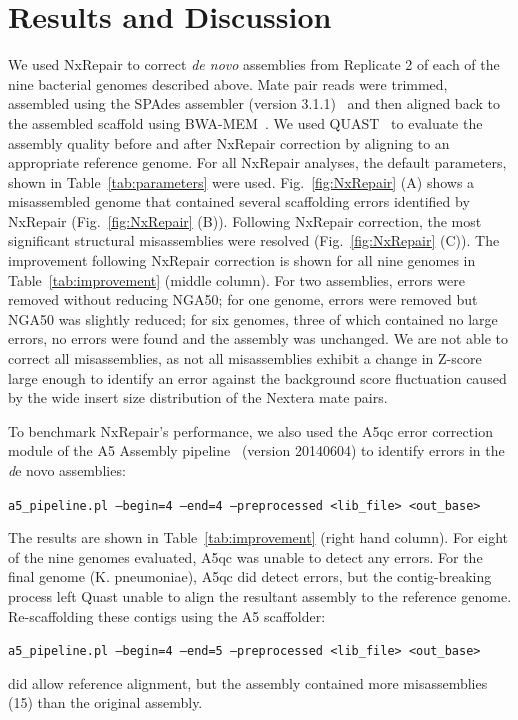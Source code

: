 \documentclass[fleqn,10pt]{wlpeerj}
\begin{document}
\section*{Results and Discussion}
We used NxRepair to correct \textit{de novo} assemblies from Replicate 2 of each of the nine bacterial genomes described above. Mate pair reads were trimmed, assembled using the SPAdes assembler (version 3.1.1)~\citep{Bankevich2012} and then aligned back to the assembled scaffold using BWA-MEM~\citep{li2013}. We used QUAST~\citep{gurevich2013} to evaluate the assembly quality before and after NxRepair correction by aligning to an appropriate reference genome. For all NxRepair analyses, the default parameters, shown in Table~\ref{tab:parameters} were used. Fig.~\ref{fig:NxRepair} (A) shows a misassembled genome that contained several scaffolding errors identified by NxRepair (Fig.~\ref{fig:NxRepair} (B)). Following NxRepair correction, the most significant structural misassemblies were resolved (Fig.~\ref{fig:NxRepair} (C)). The improvement following NxRepair correction is shown for all nine genomes in Table~\ref{tab:improvement} (middle column). For two assemblies, errors were removed without reducing NGA50; for one genome, errors were removed but NGA50 was slightly reduced; for six genomes, three of which contained no large errors, no errors were found and the assembly was unchanged. We are not able to correct all misassemblies, as not all misassemblies exhibit a change in Z-score large enough to identify an error against the background score fluctuation caused by the wide insert size distribution of the Nextera mate pairs. 

To benchmark NxRepair's performance, we also used the A5qc error correction module of the A5 Assembly pipeline~\citep{tritt2012} (version 20140604) to identify errors in the {\emph de novo} assemblies:

\texttt{a5\_pipeline.pl --begin=4 --end=4 --preprocessed <lib\_file> <out\_base>}

The results are shown in Table~\ref{tab:improvement} (right hand column). For eight of the nine genomes evaluated, A5qc was unable to detect any errors. For the final genome (K. pneumoniae), A5qc did detect errors, but the contig-breaking process left Quast unable to align the resultant assembly to the reference genome. Re-scaffolding these contigs using the A5 scaffolder:

\texttt{a5\_pipeline.pl --begin=4 --end=5 --preprocessed <lib\_file> <out\_base>}

did allow reference alignment, but the assembly contained more misassemblies (15) than the original assembly. 
\end{document}
